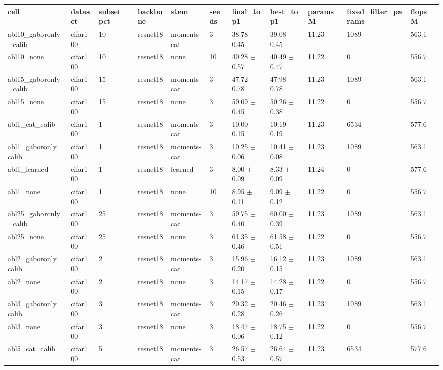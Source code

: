 \begin{tabular}{lllllllllll}
\toprule
cell & dataset & subset\_pct & backbone & stem & seeds & final\_top1 & best\_top1 & params\_M & fixed\_filter\_params & flops\_M \\
\midrule
abl10_gaboronly_calib & cifar100 & 10 & resnet18 & moments-cat & 3 & 38.78 $\pm$ 0.45 & 39.08 $\pm$ 0.45 & 11.23 & 1089 & 563.1 \\
abl10_none & cifar100 & 10 & resnet18 & none & 10 & 40.28 $\pm$ 0.57 & 40.49 $\pm$ 0.47 & 11.22 & 0 & 556.7 \\
abl15_gaboronly_calib & cifar100 & 15 & resnet18 & moments-cat & 3 & 47.72 $\pm$ 0.78 & 47.98 $\pm$ 0.78 & 11.23 & 1089 & 563.1 \\
abl15_none & cifar100 & 15 & resnet18 & none & 3 & 50.09 $\pm$ 0.45 & 50.26 $\pm$ 0.38 & 11.22 & 0 & 556.7 \\
abl1_cat_calib & cifar100 & 1 & resnet18 & moments-cat & 3 & 10.00 $\pm$ 0.15 & 10.19 $\pm$ 0.19 & 11.23 & 6534 & 577.6 \\
abl1_gaboronly_calib & cifar100 & 1 & resnet18 & moments-cat & 3 & 10.25 $\pm$ 0.06 & 10.41 $\pm$ 0.08 & 11.23 & 1089 & 563.1 \\
abl1_learned & cifar100 & 1 & resnet18 & learned & 3 & 8.00 $\pm$ 0.09 & 8.33 $\pm$ 0.09 & 11.24 & 0 & 577.6 \\
abl1_none & cifar100 & 1 & resnet18 & none & 10 & 8.95 $\pm$ 0.11 & 9.09 $\pm$ 0.12 & 11.22 & 0 & 556.7 \\
abl25_gaboronly_calib & cifar100 & 25 & resnet18 & moments-cat & 3 & 59.75 $\pm$ 0.40 & 60.00 $\pm$ 0.39 & 11.23 & 1089 & 563.1 \\
abl25_none & cifar100 & 25 & resnet18 & none & 3 & 61.35 $\pm$ 0.46 & 61.58 $\pm$ 0.51 & 11.22 & 0 & 556.7 \\
abl2_gaboronly_calib & cifar100 & 2 & resnet18 & moments-cat & 3 & 15.96 $\pm$ 0.20 & 16.12 $\pm$ 0.15 & 11.23 & 1089 & 563.1 \\
abl2_none & cifar100 & 2 & resnet18 & none & 3 & 14.17 $\pm$ 0.15 & 14.28 $\pm$ 0.17 & 11.22 & 0 & 556.7 \\
abl3_gaboronly_calib & cifar100 & 3 & resnet18 & moments-cat & 3 & 20.32 $\pm$ 0.28 & 20.46 $\pm$ 0.26 & 11.23 & 1089 & 563.1 \\
abl3_none & cifar100 & 3 & resnet18 & none & 3 & 18.47 $\pm$ 0.06 & 18.75 $\pm$ 0.12 & 11.22 & 0 & 556.7 \\
abl5_cat_calib & cifar100 & 5 & resnet18 & moments-cat & 3 & 26.57 $\pm$ 0.53 & 26.64 $\pm$ 0.57 & 11.23 & 6534 & 577.6 \\

\end{tabular}
